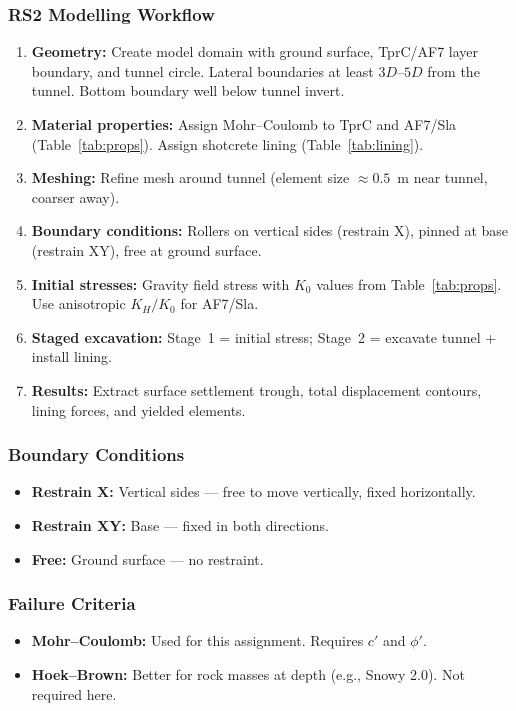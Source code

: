 \documentclass[a4paper,12pt]{article}
\begin{document}
\subsubsection{RS2 Modelling Workflow}
\begin{enumerate}
    \item \textbf{Geometry:} Create model domain with ground surface, TprC/AF7 layer boundary, and tunnel circle. Lateral boundaries at least $3D$--$5D$ from the tunnel. Bottom boundary well below tunnel invert.
    \item \textbf{Material properties:} Assign Mohr--Coulomb to TprC and AF7/Sla (Table~\ref{tab:props}). Assign shotcrete lining (Table~\ref{tab:lining}).
    \item \textbf{Meshing:} Refine mesh around tunnel (element size $\approx 0.5$~m near tunnel, coarser away).
    \item \textbf{Boundary conditions:} Rollers on vertical sides (restrain X), pinned at base (restrain XY), free at ground surface.
    \item \textbf{Initial stresses:} Gravity field stress with $K_0$ values from Table~\ref{tab:props}. Use anisotropic $K_H/K_0$ for AF7/Sla.
    \item \textbf{Staged excavation:} Stage~1 = initial stress; Stage~2 = excavate tunnel + install lining.
    \item \textbf{Results:} Extract surface settlement trough, total displacement contours, lining forces, and yielded elements.
\end{enumerate}

\subsubsection{Boundary Conditions}
\begin{itemize}
    \item \textbf{Restrain X:} Vertical sides --- free to move vertically, fixed horizontally.
    \item \textbf{Restrain XY:} Base --- fixed in both directions.
    \item \textbf{Free:} Ground surface --- no restraint.
\end{itemize}

\subsubsection{Failure Criteria}
\begin{itemize}
    \item \textbf{Mohr--Coulomb:} Used for this assignment. Requires $c'$ and $\phi'$.
    \item \textbf{Hoek--Brown:} Better for rock masses at depth (e.g., Snowy 2.0). Not required here.
\end{itemize}
\end{document}
